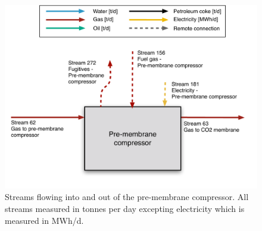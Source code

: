 \documentclass[11pt]{report}
\begin{document}
\begin{figure}
\includegraphics[width=0.85\columnwidth]{images/Pre-membrane_compressor_PF.pdf}
\caption{Streams flowing into and out of the pre-membrane compressor. All streams measured in tonnes per day excepting electricity which is measured in MWh/d.}
\label{fig:Pre_mebrane_compressor_PF}
\end{figure}
\end{document}
